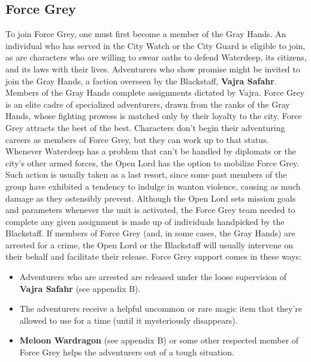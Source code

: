 \documentclass[10pt,a4paper,twoside,twocolumn,openany,nodeprecatedcode]{dndbook}
\begin{document}
\subsection{Force Grey}
To join Force Grey, one must first become a member of the Gray Hands. An individual who has served in the City Watch or the City Guard is eligible to join, as are characters who are willing to swear oaths to defend Waterdeep, its citizens, and its laws with their lives. Adventurers who show promise might be invited to join the Gray Hands, a faction overseen by the Blackstaff, \textbf{Vajra Safahr}. Members of the Gray Hands complete assignments dictated by Vajra.
Force Grey is an elite cadre of specialized adventurers, drawn from the ranks of the Gray Hands, whose fighting prowess is matched only by their loyalty to the city. Force Grey attracts the best of the best. Characters don't begin their adventuring careers as members of Force Grey, but they can work up to that status.
Whenever Waterdeep has a problem that can't be handled by diplomats or the city's other armed forces, the Open Lord has the option to mobilize Force Grey. Such action is usually taken as a last resort, since some past members of the group have exhibited a tendency to indulge in wanton violence, causing as much damage as they ostensibly prevent.
Although the Open Lord sets mission goals and parameters whenever the unit is activated, the Force Grey team needed to complete any given assignment is made up of individuals handpicked by the Blackstaff.
If members of Force Grey (and, in some cases, the Gray Hands) are arrested for a crime, the Open Lord or the Blackstaff will usually intervene on their behalf and facilitate their release.
Force Grey support comes in these ways:
\begin{itemize}

\item Adventurers who are arrested are released under the loose supervision of \textbf{Vajra Safahr} (see appendix B).
\item The adventurers receive a helpful uncommon or rare magic item that they're allowed to use for a time (until it mysteriously disappears).
\item \textbf{Meloon Wardragon} (see appendix B) or some other respected member of Force Grey helps the adventurers out of a tough situation.
\end{itemize}
\end{document}
